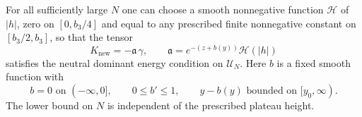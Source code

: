 \begin{lemma}
\label{flux:trace-tensor}
For all sufficiently large $N$ one can choose a smooth nonnegative
function $\mathcal H$ of $|h|$, zero on $[0,b_3/4]$ and equal to any
prescribed finite nonnegative constant on $[b_3/2,b_3]$, so that the tensor
\begin{equation}
 K_{\mathrm{new}}=-\mathfrak a\,\gamma,
 \qquad
 \mathfrak a=e^{-(z+b(y))}\mathcal H(|h|)
 \label{flux:new-tensor}
\end{equation}
satisfies the neutral dominant energy condition on $\mathcal U_N$.
Here $b$ is a fixed smooth function with
\begin{equation}
 b=0\text{ on }(-\infty,0],\qquad 0\leq b'\leq1,
 \qquad y-b(y)\text{ bounded on }[y_0,\infty).
 \label{flux:b-cutoff}
\end{equation}
The lower bound on $N$ is independent of the prescribed plateau height.
\end{lemma}

